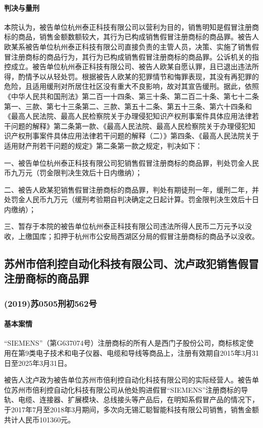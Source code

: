 \documentclass[
    a4paper
    ]{ctexart}
\begin{document}
{\begin{sloppy}
\paragraph{判决与量刑}
本院认为，被告单位杭州泰正科技有限公司以营利为目的，销售明知是假冒注册商标的商品，销售金额数额较大，其行为已构成销售假冒注册商标的商品罪。被告人欧某系被告单位杭州泰正科技有限公司直接负责的主管人员，决策、实施了销售假冒注册商标的商品行为，其行为已构成销售假冒注册商标的商品罪。公诉机关的指控成立。被告单位杭州泰正科技有限公司、被告人欧某自愿认罪，且已退出违法所得，酌情予以从轻处罚。根据被告人欧某的犯罪情节和悔罪表现，其没有再犯罪的危险，且适用缓刑对所居住社区没有重大不良影响，故对其宣告缓刑。据此，依照《中华人民共和国刑法》第二百一十四条、第三十条、第二百二十条、第七十二条第一、三款、第七十三条第二、三款、第五十二条、第五十三条、第六十四条和《最高人民法院、最高人民检察院关于办理侵犯知识产权刑事案件具体应用法律若干问题的解释》第二条第一款、《最高人民法院、最高人民检察院关于办理侵犯知识产权刑事案件具体应用法律若干问题的解释（二）》第四条、《最高人民法院关于适用财产刑若干问题的规定》第二条第一款之规定，判决如下： 

一、被告单位杭州泰正科技有限公司犯销售假冒注册商标的商品罪，判处罚金人民币九万元（罚金限判决生效后十日内缴纳）；

二、被告人欧某犯销售假冒注册商标的商品罪，判处有期徒刑一年，缓刑二年，并处罚金人民币九万元（缓刑考验期自判决确定之日起计算。罚金限判决生效后十日内缴纳）；

三、暂存于本院的被告单位杭州泰正科技有限公司违法所得人民币二万元予以没收，上缴国库；扣押于杭州市公安局西湖区分局的假冒注册商标的商品予以没收。



\subsection{苏州市倍利控自动化科技有限公司、沈卢政犯销售假冒注册商标的商品罪}
\subsubsection*{(2019)苏0505刑初562号}

\paragraph{基本案情}
“SIEMENS”（第G637074号）注册商标的所有人是西门子股份公司，商标核定使用在第9类电子技术和电子仪器、电缆和导线等商品上，注册有效期自2015年3月31日至2025年3月31日。

被告人沈卢政为被告单位苏州市倍利控自动化科技有限公司的实际经营人。被告单位苏州市倍利控自动化科技有限公司从他处购进假冒“SIEMENS”注册商标的导轨、电缆、连接器、扩展模块、总线接头等产品后，在明知系假冒产品的情况下，于2017年7月至2018年3月期间，多次向无锡汇聪智能科技有限公司销售，销售金额共计人民币101360元。


\end{sloppy}}
\end{document}
